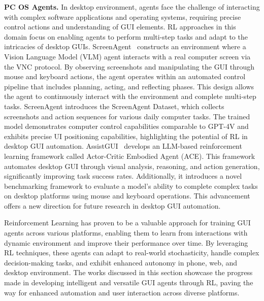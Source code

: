 \noindent\textbf{PC OS Agents.}
In desktop environment, agents face the challenge of interacting with complex software applications and operating systems, requiring precise control actions and understanding of GUI elements. RL approaches in this domain focus on enabling agents to perform multi-step tasks and adapt to the intricacies of desktop GUIs.
ScreenAgent~\cite{niu2024screenagent} constructs an environment where a Vision Language Model (VLM) agent interacts with a real computer screen via the VNC protocol. By observing screenshots and manipulating the GUI through mouse and keyboard actions, the agent operates within an automated control pipeline that includes planning, acting, and reflecting phases. This design allows the agent to continuously interact with the environment and complete multi-step tasks. ScreenAgent introduces the ScreenAgent Dataset, which collects screenshots and action sequences for various daily computer tasks. The trained model demonstrates computer control capabilities comparable to GPT-4V and exhibits precise UI positioning capabilities, highlighting the potential of RL in desktop GUI automation.
AssistGUI~\cite{gao2023assistgui} develops an LLM-based reinforcement learning framework called Actor-Critic Embodied Agent (ACE). This framework automates desktop GUI through visual analysis, reasoning, and action generation, significantly improving task success rates. Additionally, it introduces a novel benchmarking framework to evaluate a model's ability to complete complex tasks on desktop platforms using mouse and keyboard operations. This advancement offers a new direction for future research in desktop GUI automation.



Reinforcement Learning has proven to be a valuable approach for training GUI agents across various platforms, enabling them to learn from interactions with dynamic environment and improve their performance over time. By leveraging RL techniques, these agents can adapt to real-world stochasticity, handle complex decision-making tasks, and exhibit enhanced autonomy in phone, web, and desktop environment. The works discussed in this section showcase the progress made in developing intelligent and versatile GUI agents through RL, paving the way for enhanced automation and user interaction across diverse platforms.